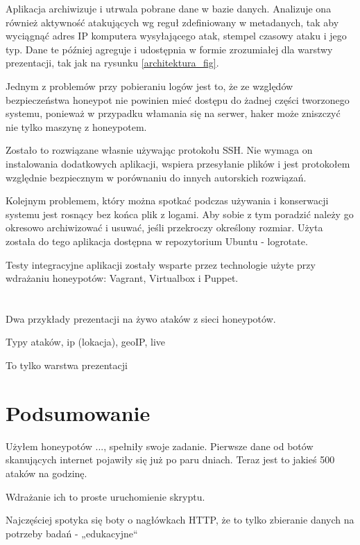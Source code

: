 \documentclass[runningheads,a4paper]{llncs}
\begin{document}
Aplikacja archiwizuje i utrwala pobrane dane w bazie danych. Analizuje ona również aktywność atakujących wg reguł zdefiniowany w metadanych, tak aby wyciągnąć adres IP komputera wysyłającego atak, stempel czasowy ataku i jego typ. Dane te później agreguje i udostępnia w formie zrozumiałej dla warstwy prezentacji, tak jak na rysunku \ref{architektura_fig}.

Jednym z problemów przy pobieraniu logów jest to, że ze względów bezpieczeństwa honeypot nie powinien mieć dostępu do żadnej części tworzonego systemu, ponieważ w przypadku włamania się na serwer, haker może zniszczyć nie tylko maszynę z honeypotem.

Zostało to rozwiązane własnie używając protokołu SSH. Nie wymaga on instalowania dodatkowych aplikacji, wspiera przesyłanie plików i jest protokołem względnie bezpiecznym w porównaniu do innych autorskich rozwiązań.

Kolejnym problemem, który można spotkać podczas używania i konserwacji systemu jest rosnący bez końca plik z logami. Aby sobie z tym poradzić należy go okresowo archiwizować i usuwać, jeśli przekroczy określony rozmiar. Użyta została do tego aplikacja dostępna w repozytorium Ubuntu - logrotate.

Testy integracyjne aplikacji zostały wsparte przez technologie użyte przy wdrażaniu honeypotów: Vagrant, Virtualbox i Puppet.

\section{}
Dwa przykłady prezentacji na żywo ataków z sieci honeypotów.

Typy ataków, ip (lokacja), geoIP, live

To tylko warstwa prezentacji
\section{Podsumowanie}
Użyłem honeypotów ..., spełniły swoje zadanie. Pierwsze dane od botów skanujących internet pojawiły się już po paru dniach. Teraz jest to jakieś 500 ataków na godzinę.

Wdrażanie ich to proste uruchomienie skryptu.

Najczęściej spotyka się boty o nagłówkach HTTP, że to tylko zbieranie danych na potrzeby badań - „edukacyjne“
\end{document}
